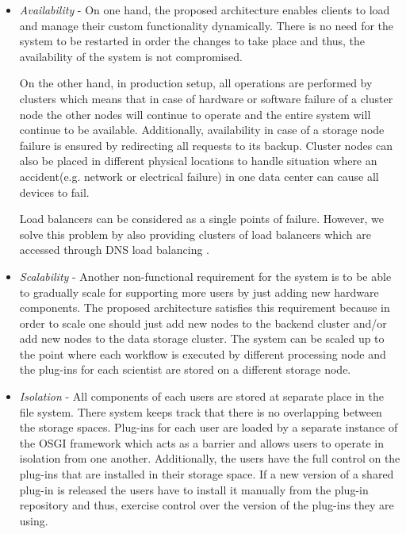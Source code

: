 \begin{itemize}

\item \textit{Availability} - On one hand, the proposed architecture enables clients to load and manage their custom functionality dynamically. There is no need for the system to be restarted in order the changes to take place and thus, the availability of the system is not compromised.

On the other hand, in production setup, all operations are performed by clusters which means that in case of hardware or software failure of a cluster node the other nodes will continue to operate and the entire system will continue to be available. Additionally, availability in case of a storage node failure is ensured by redirecting all requests to its backup. Cluster nodes can also be placed in different physical locations to handle situation where an accident(e.g. network or electrical failure) in one data center can cause all devices to fail. 

Load balancers can be considered as a single points of failure. However, we solve this problem by also providing clusters of load balancers which are accessed through DNS load balancing \cite{Membrey}.

\item \textit{Scalability} - Another non-functional requirement for the system is to be able to gradually scale for supporting more users  by just adding new hardware components. The proposed architecture satisfies this requirement because in order to scale one should just add new nodes to the backend cluster and/or add new nodes to the data storage cluster. The system can be scaled up to the point where each workflow is executed by different processing node and the plug-ins for each scientist are stored on a different storage node.

\item \textit{Isolation} - All components of each users are stored at separate place in the file system. There system keeps track that there is no overlapping between the storage spaces. Plug-ins for each user are loaded by a separate instance of the OSGI framework which acts as a barrier and allows users to operate in isolation from one another. Additionally, the users have the full control on the plug-ins that are installed in their storage space. If a new version of a shared plug-in is released the users have to install it manually from the plug-in repository and thus, exercise control over the version of the plug-ins they are using. 



\end{itemize}
